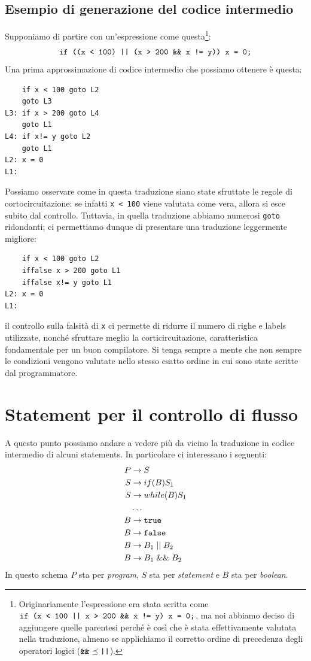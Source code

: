 \documentclass[class=book, crop=false, oneside, 12pt]{standalone}
\begin{document}
\subsection{Esempio di generazione del codice intermedio}
Supponiamo di partire con un'espressione come questa\footnote{Originariamente l'espressione era stata scritta come \(\textrm{\texttt{if (x < 100 || x > 200 \&\& x != y) x = 0;}}\), ma noi abbiamo deciso di aggiungere quelle parentesi perché è così che è stata effettivamente valutata nella traduzione, almeno se applichiamo il corretto ordine di precedenza degli operatori logici (\(\textrm{\texttt{\&\&}} \preceq \textrm{\texttt{||}}\)).}:
\begin{equation*}
    \textrm{\texttt{if ((x < 100) || (x > 200 \&\& x != y)) x = 0;}}
\end{equation*}
Una prima approssimazione di codice intermedio che possiamo ottenere è questa:
\begin{verbatim}
    if x < 100 goto L2
    goto L3
L3: if x > 200 goto L4
    goto L1
L4: if x!= y goto L2
    goto L1
L2: x = 0
L1:
\end{verbatim}
Possiamo osservare come in questa traduzione siano state sfruttate le regole di cortocircuitazione: se infatti \texttt{x < 100} viene valutata come vera, allora si esce subito dal controllo. Tuttavia, in quella traduzione abbiamo numerosi \texttt{goto} ridondanti; ci permettiamo dunque di presentare una traduzione leggermente migliore:
\begin{verbatim}
    if x < 100 goto L2
    iffalse x > 200 goto L1
    iffalse x!= y goto L1   
L2: x = 0
L1:
\end{verbatim}
il controllo sulla falsità di \texttt{x} ci permette di ridurre il numero di righe e labels utilizzate, nonché sfruttare meglio la corticircuitazione, caratteristica fondamentale per un buon compilatore. Si tenga sempre a mente che non sempre le condizioni vengono valutate nello stesso esatto ordine in cui sono state scritte dal programmatore.

\section{Statement per il controllo di flusso}
A questo punto possiamo andare a vedere più da vicino la traduzione in codice intermedio di alcuni statements. In particolare ci interessano i seguenti:
\begin{align*}
    P &\to S \\
    S &\to if (B) S_1 \\
    S &\to while (B) S_1 \\
    &\ldots \\
    B &\to \textrm{\texttt{true}} \\
    B &\to \textrm{\texttt{false}} \\
    B &\to B_1\; ||\; B_2 \\
    B &\to B_1\; \&\&\; B_2
\end{align*}
In questo schema \(P\) sta per \emph{program}, \(S\) sta per \emph{statement} e \(B\) sta per \emph{boolean}.
\end{document}

